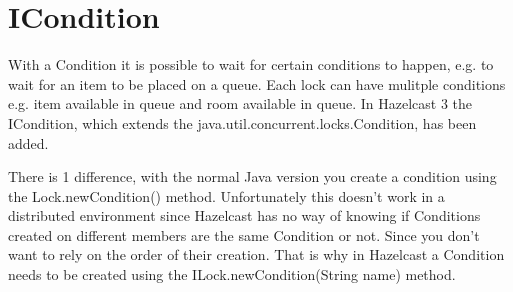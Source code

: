 \section{ICondition}
With a Condition it is possible to wait for certain conditions to happen, e.g. to wait for an item to be placed on a queue. Each lock can have mulitple conditions e.g. item available in queue and room available in queue. In Hazelcast 3 the ICondition, which extends the java.util.concurrent.locks.Condition, has been added.

There is 1 difference, with the normal Java version you create a condition using the Lock.newCondition() method. Unfortunately this doesn't work in a distributed environment since Hazelcast has no way of knowing if Conditions created on different members are the same Condition or not. Since you don't want to rely on the order of their creation. That is why in Hazelcast a Condition needs to be created using the ILock.newCondition(String name) method.

